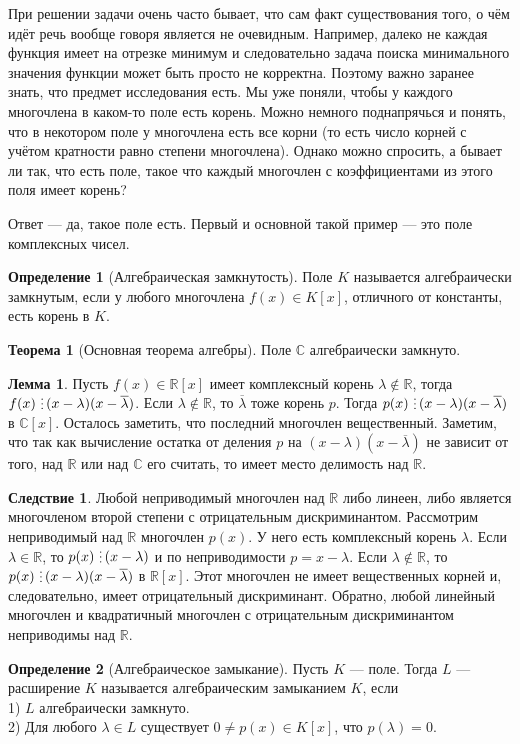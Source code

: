 \documentclass[10pt,a4paper,oneside]{book} %
\theoremstyle{definition}
\newtheorem*{defn}{Определение}
\newtheorem{thm}{Теорема}
\newtheorem{lem}{Лемма}
\newtheorem{cor}{Следствие}
\newcommand{\mb}[1]{\mathbb{#1}}
\newcommand{\ovl}{\overline}
\newcommand{\di}{\mathop{\,\scalebox{0.85}{\raisebox{-1.2pt}[0.5\height]{\vdots}}\,}}
\def\thrm{\begin{thm}}
\def\ethrm{\end{thm}}
\def\dfn{\begin{defn}}
\def\edfn{\end{defn}}
\def\lm{\begin{lem}}
\def\elm{\end{lem}}
\def\crl{\begin{cor}}
\def\ecrl{\end{cor}}
\begin{document}
При решении задачи очень часто бывает, что сам факт существования того, о чём идёт речь вообще говоря является не очевидным. Например, далеко не каждая функция имеет на отрезке минимум и следовательно задача поиска минимального значения функции может быть просто не корректна. Поэтому важно заранее знать, что предмет исследования есть. Мы уже поняли, чтобы у каждого многочлена в каком-то поле есть корень. Можно немного поднапрячься и понять, что в некотором поле у многочлена есть все корни (то есть число корней с учётом кратности равно степени многочлена). Однако можно спросить, а бывает ли так, что есть поле, такое что каждый многочлен с коэффициентами из этого поля имеет корень?

Ответ — да, такое поле есть. Первый и основной такой пример --- это поле комплексных чисел.
\dfn[Алгебраическая замкнутость] Поле $K$ называется алгебраически замкнутым, если у любого многочлена  $f(x)\in K[x]$, отличного от константы, есть корень в $K$.
\edfn

\thrm[Основная теорема алгебры] Поле $\mb C$ алгебраически замкнуто.
\ethrm

\lm Пусть $f(x)\in \mb R[x]$ имеет комплексный корень $\lambda \notin \mb R$, тогда $f(x)\di(x-\lambda)(x-\ovl{\lambda})$.
\proof Если $\lambda \notin \mb R$, то $\ovl{\lambda}$ тоже корень $p$. Тогда $p(x)\di(x-\lambda)(x-\ovl{\lambda})$ в $\mb C[x]$. Осталось заметить, что последний многочлен вещественный. Заметим, что так как вычисление остатка от деления $p$ на $(x-\lambda)(x-\ovl{\lambda})$ не зависит от того, над $\mb R$ или над $\mb C$ его считать, то имеет место делимость над $\mb R$.
\endproof
\elm

\crl Любой неприводимый многочлен над $\mb R$ либо линеен, либо является многочленом второй степени с отрицательным дискриминантом.
\proof Рассмотрим неприводимый над $\mb R$ многочлен $p(x)$. У него есть комплексный корень $\lambda$. Если $\lambda \in \mb R$, то $p(x)\di (x-\lambda)$ и по неприводимости $p=x-\lambda$.  Если $\lambda \notin \mb R$, то $p(x)\di (x-\lambda)(x-\ovl{\lambda})$ в $\mb R[x]$. Этот многочлен не имеет вещественных корней и, следовательно, имеет отрицательный дискриминант. Обратно, любой линейный многочлен и квадратичный многочлен с отрицательным дискриминантом неприводимы над $\mb R$.
\endproof
\ecrl

\dfn[Алгебраическое замыкание] Пусть $K$ --- поле. Тогда $L$ --- расширение $K$ называется алгебраическим замыканием $K$, если \\
1) $L$ алгебраически замкнуто.\\
2) Для любого $ \lambda \in L$ существует $0\neq p(x)\in K[x]$, что $p(\lambda)=0$.
\edfn
\end{document}
